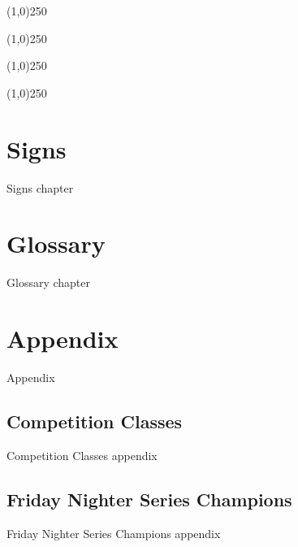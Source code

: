 \documentclass[letterpaper,11pt]{article}
\begin{document}
\cleardoublepage


\tableofcontents

\cleardoublepage

\pagestyle{plain}


\begin{center}
\line(1,0){250}
\end{center}


\begin{center}
\line(1,0){250}
\end{center}


\begin{center}
\line(1,0){250}
\end{center}


\begin{center}
\line(1,0){250}
\end{center}


\section{Signs}

Signs chapter

\section{Glossary}

Glossary chapter


\section{Appendix}

Appendix

\subsection{Competition Classes}

Competition Classes appendix

\subsection{Friday Nighter Series Champions}

Friday Nighter Series Champions appendix
\end{document}
